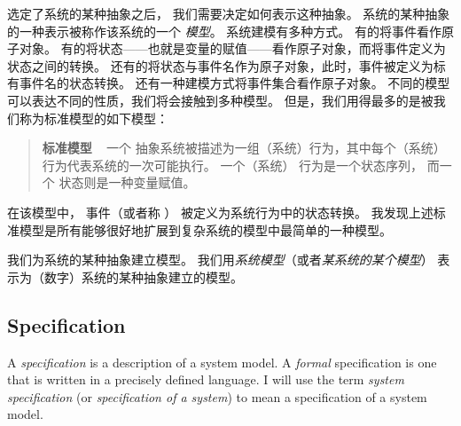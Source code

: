 \begin{ch}
  选定了系统的某种抽象之后，
  我们需要决定如何表示这种抽象。
  系统的某种抽象的一种表示被称作该系统的一个%
  \emph{模型}。
  系统建模有多种方式。
  有的将事件看作原子对象。
  有的将状态——也就是变量的赋值——看作原子对象，而将事件定义为状态之间的转换。
  还有的将状态与事件名作为原子对象，此时，事件被定义为标有事件名的状态转换。
  还有一种建模方式将事件集合看作原子对象。
  不同的模型可以表达不同的性质，我们将会接触到多种模型。
  但是，我们用得最多的是被我们称为标准模型的如下模型：
  \begin{quote}
    \textbf{标准模型} \  
    一个%
    抽象系统被描述为一组（系统）行为，其中每个（系统）行为代表系统的一次可能执行。
    一个（系统）%
    行为是一个状态序列，
    而一个%
    状态则是一种变量赋值。
  \end{quote}
  在该模型中，%
  事件（或者称%
  \emph{\tlastep{}}）
  被定义为系统行为中的状态转换。
  我发现上述标准模型是所有能够很好地扩展到复杂系统的模型中最简单的一种模型。

  我们为系统的某种抽象建立模型。
  我们用\emph{系统模型}（或者\emph{某系统的某个模型}）
  表示为（数字）系统的某种抽象建立的模型。
\end{ch}


\begin{en}
%
\vspace{-\baselineskip}
\subsection{Specification}    
A \emph{specification} 
is a description of a system model.  A
\emph{formal} specification is one that is written in a precisely
defined language.  I will use the term \emph{system specification} (or
\emph{specification of a system}) to mean a specification of a system
model.  
\end{en}

